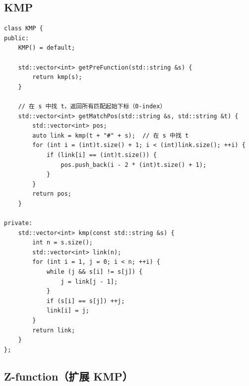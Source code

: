 
\subsection{KMP}


    \begin{lstlisting}
class KMP {
public:
    KMP() = default;

    std::vector<int> getPreFunction(std::string &s) {
        return kmp(s);
    }

    // 在 s 中找 t，返回所有匹配起始下标（0-index）
    std::vector<int> getMatchPos(std::string &s, std::string &t) {
        std::vector<int> pos;
        auto link = kmp(t + "#" + s);  // 在 s 中找 t
        for (int i = (int)t.size() + 1; i < (int)link.size(); ++i) {
            if (link[i] == (int)t.size()) {
                pos.push_back(i - 2 * (int)t.size() + 1);
            }
        }
        return pos;
    }

private:
    std::vector<int> kmp(const std::string &s) {
        int n = s.size();
        std::vector<int> link(n);
        for (int i = 1, j = 0; i < n; ++i) {
            while (j && s[i] != s[j]) {
                j = link[j - 1];
            }
            if (s[i] == s[j]) ++j;
            link[i] = j;
        }
        return link;
    }
};
    \end{lstlisting}

\subsection{Z-function（扩展 KMP）}


